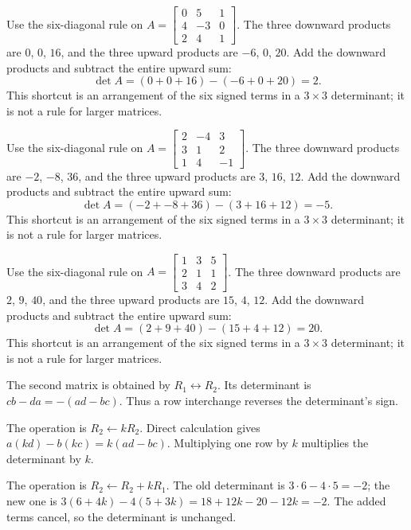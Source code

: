 \goal Use the six-diagonal rule on $A=\begin{bmatrix}0&5&1\\4&-3&0\\2&4&1\end{bmatrix}$.
The three downward products are $0$, $0$, $16$, and the three upward products are $-6$, $0$, $20$. Add the downward products and subtract the entire upward sum:
\[\det A=(0+0+16)-(-6+0+20)=2.\]
This shortcut is an arrangement of the six signed terms in a $3\times3$ determinant; it is not a rule for larger matrices.

\goal Use the six-diagonal rule on $A=\begin{bmatrix}2&-4&3\\3&1&2\\1&4&-1\end{bmatrix}$.
The three downward products are $-2$, $-8$, $36$, and the three upward products are $3$, $16$, $12$. Add the downward products and subtract the entire upward sum:
\[\det A=(-2+-8+36)-(3+16+12)=-5.\]
This shortcut is an arrangement of the six signed terms in a $3\times3$ determinant; it is not a rule for larger matrices.

\goal Use the six-diagonal rule on $A=\begin{bmatrix}1&3&5\\2&1&1\\3&4&2\end{bmatrix}$.
The three downward products are $2$, $9$, $40$, and the three upward products are $15$, $4$, $12$. Add the downward products and subtract the entire upward sum:
\[\det A=(2+9+40)-(15+4+12)=20.\]
This shortcut is an arrangement of the six signed terms in a $3\times3$ determinant; it is not a rule for larger matrices.

The second matrix is obtained by $R_1\leftrightarrow R_2$. Its determinant is $cb-da=-(ad-bc)$. Thus a row interchange reverses the determinant's sign.

The operation is $R_2\leftarrow kR_2$. Direct calculation gives $a(kd)-b(kc)=k(ad-bc)$. Multiplying one row by $k$ multiplies the determinant by $k$.

The operation is $R_2\leftarrow R_2+kR_1$. The old determinant is $3\cdot6-4\cdot5=-2$; the new one is $3(6+4k)-4(5+3k)=18+12k-20-12k=-2$. The added terms cancel, so the determinant is unchanged.

